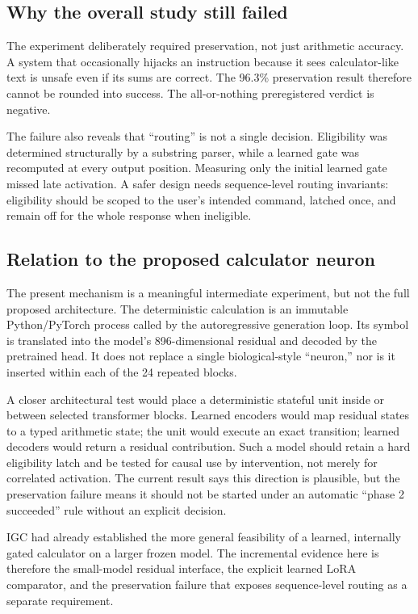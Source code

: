 \documentclass[11pt]{article}
\begin{document}
\subsection{Why the overall study still failed}

The experiment deliberately required preservation, not just arithmetic
accuracy. A system that occasionally hijacks an instruction because it sees
calculator-like text is unsafe even if its sums are correct. The 96.3\%
preservation result therefore cannot be rounded into success. The all-or-nothing
preregistered verdict is negative.

The failure also reveals that ``routing'' is not a single decision. Eligibility
was determined structurally by a substring parser, while a learned gate was
recomputed at every output position. Measuring only the initial learned gate
missed late activation. A safer design needs sequence-level routing invariants:
eligibility should be scoped to the user's intended command, latched once, and
remain off for the whole response when ineligible.

\subsection{Relation to the proposed calculator neuron}

The present mechanism is a meaningful intermediate experiment, but not the
full proposed architecture. The deterministic calculation is an immutable
Python/PyTorch process called by the autoregressive generation loop. Its symbol
is translated into the model's 896-dimensional residual and decoded by the
pretrained head. It does not replace a single biological-style ``neuron,'' nor
is it inserted within each of the 24 repeated blocks.

A closer architectural test would place a deterministic stateful unit inside
or between selected transformer blocks. Learned encoders would map residual
states to a typed arithmetic state; the unit would execute an exact transition;
learned decoders would return a residual contribution. Such a model should
retain a hard eligibility latch and be tested for causal use by intervention,
not merely for correlated activation. The current result says this direction
is plausible, but the preservation failure means it should not be started
under an automatic ``phase 2 succeeded'' rule without an explicit decision.

IGC had already established the more general feasibility of a learned,
internally gated calculator on a larger frozen model. The incremental evidence
here is therefore the small-model residual interface, the explicit learned
LoRA comparator, and the preservation failure that exposes sequence-level
routing as a separate requirement.
\end{document}
